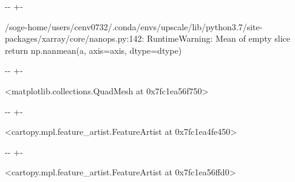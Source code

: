 \documentclass[letterpaper,10pt,english]{sphinxmanual}
\newlength\nbsphinxcodecellspacing
\begin{document}
{

\kern-\sphinxverbatimsmallskipamount\kern-\baselineskip
\kern+\FrameHeightAdjust\kern-\fboxrule
\vspace{\nbsphinxcodecellspacing}

\begin{sphinxVerbatim}[commandchars=\\\{\}]
/soge-home/users/cenv0732/.conda/envs/upscale/lib/python3.7/site-packages/xarray/core/nanops.py:142: RuntimeWarning: Mean of empty slice
  return np.nanmean(a, axis=axis, dtype=dtype)
\end{sphinxVerbatim}
}

{

\kern-\sphinxverbatimsmallskipamount\kern-\baselineskip
\kern+\FrameHeightAdjust\kern-\fboxrule
\vspace{\nbsphinxcodecellspacing}

\begin{sphinxVerbatim}[commandchars=\\\{\}]
\llap{\color{nbsphinxout}[32]:\,\hspace{\fboxrule}\hspace{\fboxsep}}<matplotlib.collections.QuadMesh at 0x7fc1ea56f750>
\end{sphinxVerbatim}
}

{

\kern-\sphinxverbatimsmallskipamount\kern-\baselineskip
\kern+\FrameHeightAdjust\kern-\fboxrule
\vspace{\nbsphinxcodecellspacing}

\begin{sphinxVerbatim}[commandchars=\\\{\}]
\llap{\color{nbsphinxout}[32]:\,\hspace{\fboxrule}\hspace{\fboxsep}}<cartopy.mpl.feature\_artist.FeatureArtist at 0x7fc1ea4fe450>
\end{sphinxVerbatim}
}

{

\kern-\sphinxverbatimsmallskipamount\kern-\baselineskip
\kern+\FrameHeightAdjust\kern-\fboxrule
\vspace{\nbsphinxcodecellspacing}

\begin{sphinxVerbatim}[commandchars=\\\{\}]
\llap{\color{nbsphinxout}[32]:\,\hspace{\fboxrule}\hspace{\fboxsep}}<cartopy.mpl.feature\_artist.FeatureArtist at 0x7fc1ea56ffd0>
\end{sphinxVerbatim}
}
\end{document}
